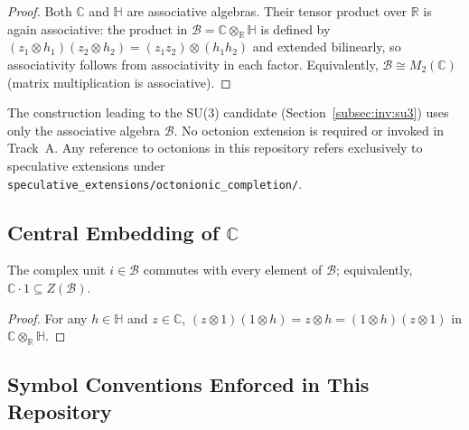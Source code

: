 \begin{proof}
  Both $\mathbb{C}$ and $\mathbb{H}$ are associative algebras.  Their tensor
  product over $\mathbb{R}$ is again associative: the product in
  $\mathcal{B} = \mathbb{C}\otimes_\mathbb{R}\mathbb{H}$ is defined by
  $(z_1\otimes h_1)(z_2\otimes h_2) = (z_1 z_2)\otimes(h_1 h_2)$ and
  extended bilinearly, so associativity follows from associativity in each
  factor.  Equivalently, $\mathcal{B}\cong M_2(\mathbb{C})$ (matrix
  multiplication is associative).
\end{proof}

\begin{remark}
  \label{rem:no_octonions}
  The construction leading to the SU(3) candidate (Section~\ref{subsec:inv:su3})
  uses only the associative algebra $\mathcal{B}$.  No octonion extension is
  required or invoked in Track~A.  Any reference to octonions in this
  repository refers exclusively to speculative extensions under
  \texttt{speculative\_extensions/octonionic\_completion/}.
\end{remark}

\subsection{Central Embedding of $\mathbb{C}$}

\begin{lemma}
  \label{lem:C_central}
  The complex unit $i\in\mathcal{B}$ commutes with every element of
  $\mathcal{B}$; equivalently, $\mathbb{C}\cdot 1 \subseteq Z(\mathcal{B})$.
\end{lemma}

\begin{proof}
  For any $h\in\mathbb{H}$ and $z\in\mathbb{C}$,
  $(z\otimes 1)(1\otimes h) = z\otimes h = (1\otimes h)(z\otimes 1)$
  in $\mathbb{C}\otimes_\mathbb{R}\mathbb{H}$.
\end{proof}

\subsection{Symbol Conventions Enforced in This Repository}

